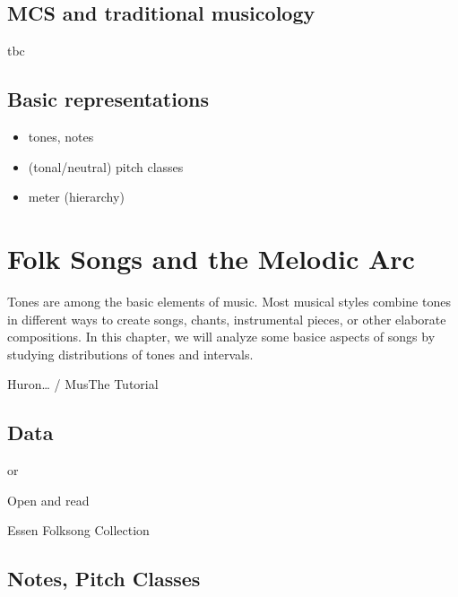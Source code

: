 \documentclass[letterpaper,10pt,english]{sphinxmanual}
\begin{document}
\section{MCS and traditional musicology}
\label{\detokenize{2_introduction:mcs-and-traditional-musicology}}
tbc


\section{Basic representations}
\label{\detokenize{2_introduction:basic-representations}}\begin{itemize}
\item {} 
tones, notes

\item {} 
(tonal/neutral) pitch classes

\item {} 
meter (hierarchy)

\end{itemize}


\chapter{Folk Songs and the Melodic Arc}
\label{\detokenize{3_folk_songs:folk-songs-and-the-melodic-arc}}\label{\detokenize{3_folk_songs::doc}}
Tones are among the basic elements of music. Most musical styles combine tones in different ways
to create songs, chants, instrumental pieces, or other elaborate compositions.
In this chapter, we will analyze some basice aspects of songs by studying distributions of tones and intervals.

Huron… / MusThe Tutorial


\section{Data}
\label{\detokenize{3_folk_songs:data}}
or 

Open and read 

Essen Folksong Collection


\section{Notes, Pitch Classes}
\label{\detokenize{3_folk_songs:notes-pitch-classes}}
\end{document}

